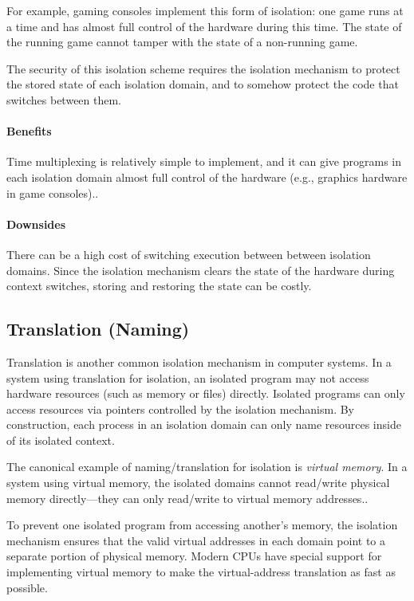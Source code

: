 For example, gaming consoles implement this
form of isolation: one game runs at a time
and has almost full control of the hardware
during this time.
The state of the running game cannot tamper with
the state of a non-running game.

The security of this isolation scheme requires
the isolation mechanism to protect the stored
state of each isolation domain, and to somehow
protect the code that switches between them.

\paragraph{Benefits}
Time multiplexing is relatively simple to
implement, and it can give programs in 
each isolation domain almost full control
of the hardware (e.g., graphics hardware
in game consoles)..

\paragraph{Downsides}
There can be a high cost of switching 
execution between between isolation domains.
Since the isolation mechanism clears the
state of the hardware during context switches, 
storing and restoring the state can be costly.

\subsection{Translation (Naming)}
Translation is another common isolation mechanism 
in computer systems.
In a system using translation for isolation, 
an isolated program may not access hardware resources
(such as memory or files)
directly.
Isolated programs can only access resources 
via pointers controlled
by the isolation mechanism.
By construction, each process in an isolation domain can
only name resources inside of its isolated context.

The canonical example of naming/translation for
isolation is \emph{virtual memory}.
In a system using virtual memory, the isolated
domains cannot read/write physical memory directly---they
can only read/write to virtual memory addresses..

To prevent one isolated program from accessing another's memory, 
the isolation mechanism ensures that the valid virtual addresses
in each domain point to a separate portion of physical memory.
Modern CPUs have special support for implementing virtual 
memory to make the virtual-address translation as fast as possible.

